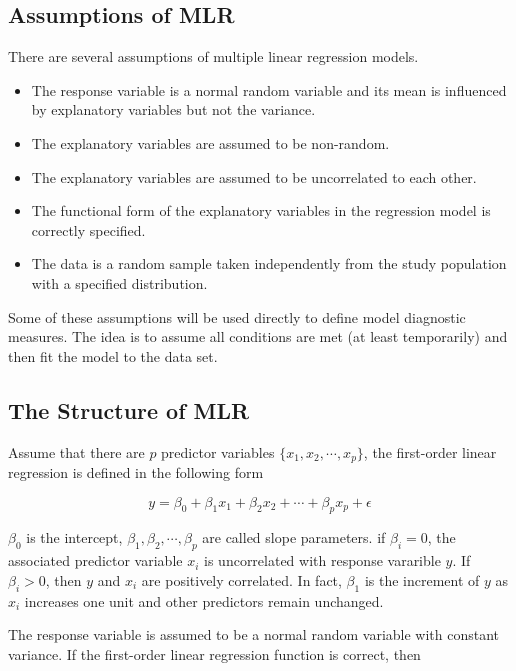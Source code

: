 \documentclass[
]{book}
\begin{document}
\hypertarget{assumptions-of-mlr}{%
\subsection{Assumptions of MLR}\label{assumptions-of-mlr}}

There are several assumptions of multiple linear regression models.

\begin{itemize}
\item
  The response variable is a normal random variable and its mean is influenced by explanatory variables but not the variance.
\item
  The explanatory variables are assumed to be non-random.
\item
  The explanatory variables are assumed to be uncorrelated to each other.
\item
  The functional form of the explanatory variables in the regression model is correctly specified.
\item
  The data is a random sample taken independently from the study population with a specified distribution.
\end{itemize}

Some of these assumptions will be used directly to define model diagnostic measures. The idea is to assume all conditions are met (at least temporarily) and then fit the model to the data set.

\hypertarget{the-structure-of-mlr}{%
\subsection{The Structure of MLR}\label{the-structure-of-mlr}}

Assume that there are \(p\) predictor variables \(\{x_1, x_2, \cdots, x_p \}\), the first-order linear regression is defined in the following form

\[
y = \beta_0 + \beta_1 x_1 + \beta_2 x_2 + \cdots + \beta_p x_p + \epsilon
\]

\(\beta_0\) is the intercept, \(\beta_1, \beta_2, \cdots, \beta_p\) are called slope parameters. if \(\beta_i=0\), the associated predictor variable \(x_i\) is uncorrelated with response vararible \(y\). If \(\beta_i > 0\), then \(y\) and \(x_i\) are positively correlated. In fact, \(\beta_1\) is the increment of \(y\) as \(x_i\) increases one unit and other predictors remain unchanged.

The response variable is assumed to be a normal random variable with constant variance. If the first-order linear regression function is correct, then
\end{document}
